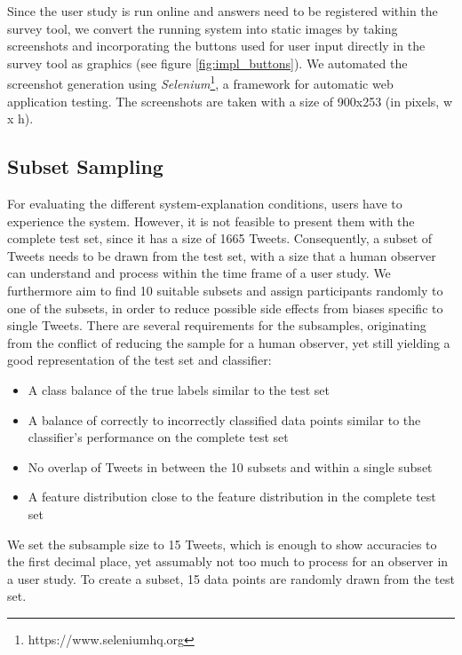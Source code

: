 \noindent Since the user study is run online and answers need to be registered within the survey tool, we convert the running system into static images by taking screenshots and incorporating the buttons used for user input directly in the survey tool as graphics (see figure \ref{fig:impl_buttons}). We automated the screenshot generation using \textit{Selenium}\footnote{https://www.seleniumhq.org}, a framework for automatic web application testing. The screenshots are taken with a size of 900x253 (in pixels, w x h).



\subsection{Subset Sampling}
For evaluating the different system-explanation conditions, users have to experience the system. However, it is not feasible to present them with the complete test set, since it has a size of 1665 Tweets. Consequently, a subset of Tweets needs to be drawn from the test set, with a size that a human observer can understand and process within the time frame of a user study.\newline
We furthermore aim to find 10 suitable subsets and assign participants randomly to one of the subsets, in order to reduce possible side effects from biases specific to single Tweets.\newline
There are several requirements for the subsamples, originating from the conflict of reducing the sample for a human observer, yet still yielding a good representation of the test set and classifier:\newline
\begin{itemize}
	\item A class balance of the true labels similar to the test set
	\item A balance of correctly to incorrectly classified data points similar to the classifier's performance on the complete test set
	\item No overlap of Tweets in between the 10 subsets and within a single subset
	\item A feature distribution close to the feature distribution in the complete test set
\end{itemize}
We set the subsample size to 15 Tweets, which is enough to show accuracies to the first decimal place, yet assumably not too much to process for an observer in a user study.\newline
To create a subset, 15 data points are randomly drawn from the test set. \newline
